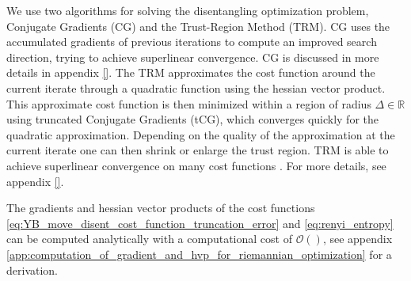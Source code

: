 We use two algorithms for solving the disentangling optimization problem, Conjugate Gradients (CG) and the Trust-Region Method (TRM). CG uses the accumulated gradients of previous iterations to compute an improved search direction, trying to achieve superlinear convergence. CG is discussed in more details in appendix \ref{}. The TRM approximates the cost function around the current iterate through a quadratic function using the hessian vector product. This approximate cost function is then minimized within a region of radius $\Delta\in\mathbb{R}$ using truncated Conjugate Gradients (tCG), which converges quickly for the quadratic approximation. Depending on the quality of the approximation at the current iterate one can then shrink or enlarge the trust region. TRM is able to achieve superlinear convergence on many cost functions \cite{cite:optimization_on_matrix_manifolds}. For more details, see appendix \ref{}. \par
The gradients and hessian vector products of the cost functions \eqref{eq:YB_move_disent_cost_function_truncation_error} and \eqref{eq:renyi_entropy} can be computed analytically with a computational cost of $\mathcal{O}()$, see appendix \ref{app:computation_of_gradient_and_hvp_for_riemannian_optimization} for a derivation.
